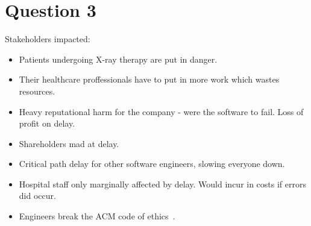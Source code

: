 \documentclass[12pt]{article}
\begin{document}
\section*{Question 3}
Stakeholders impacted:
\begin{itemize}
    \item Patients undergoing X-ray therapy are put in danger.
    \item Their healthcare proffessionals have to put in more work which wastes resources.
    \item Heavy reputational harm for the company \-- were the software to fail. Loss of profit on delay.
    \item Shareholders mad at delay.
    \item Critical path delay for other software engineers, slowing everyone down.
    \item Hospital staff only marginally affected by delay. Would incur in costs if errors did occur.
    \item Engineers break the ACM code of ethics~\cite{acm-ethics}.
\end{itemize}

\newpage
\printbibliography{}
\end{document}
